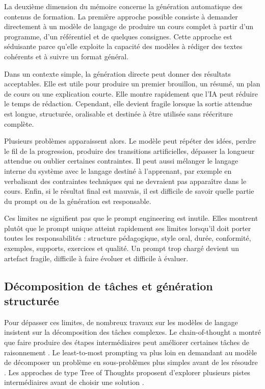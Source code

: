 \documentclass[12pt,a4paper]{article}
\begin{document}
La deuxième dimension du mémoire concerne la génération automatique des contenus de
formation. La première approche possible consiste à demander directement à un modèle
de langage de produire un cours complet à partir d'un programme, d'un référentiel et de
quelques consignes. Cette approche est séduisante parce qu'elle exploite la capacité des
modèles à rédiger des textes cohérents et à suivre un format général.

Dans un contexte simple, la génération directe peut donner des résultats acceptables. Elle
est utile pour produire un premier brouillon, un résumé, un plan de cours ou une
explication courte. Elle montre rapidement que l'IA peut réduire le temps de rédaction.
Cependant, elle devient fragile lorsque la sortie attendue est longue, structurée,
oralisable et destinée à être utilisée sans réécriture complète.

Plusieurs problèmes apparaissent alors. Le modèle peut répéter des idées, perdre le fil de
la progression, produire des transitions artificielles, dépasser la longueur attendue ou
oublier certaines contraintes. Il peut aussi mélanger le langage interne du système avec
le langage destiné à l'apprenant, par exemple en verbalisant des contraintes techniques
qui ne devraient pas apparaître dans le cours. Enfin, si le résultat final est mauvais, il est
difficile de savoir quelle partie du prompt ou de la génération est responsable.

Ces limites ne signifient pas que le prompt engineering est inutile. Elles montrent plutôt
que le prompt unique atteint rapidement ses limites lorsqu'il doit porter toutes les
responsabilités : structure pédagogique, style oral, durée, conformité, exemples,
supports, exercices et qualité. Un prompt trop chargé devient un artefact fragile, difficile
à faire évoluer et difficile à évaluer.

\subsection{Décomposition de tâches et génération structurée}

Pour dépasser ces limites, de nombreux travaux sur les modèles de langage insistent sur
la décomposition des tâches complexes. Le chain-of-thought a montré que faire produire
des étapes intermédiaires peut améliorer certaines tâches de raisonnement
\cite{wei2022chain}. Le least-to-most prompting va plus loin en demandant au modèle de
décomposer un problème en sous-problèmes plus simples avant de les résoudre
\cite{zhou2022least}. Les approches de type Tree of Thoughts proposent d'explorer
plusieurs pistes intermédiaires avant de choisir une solution \cite{yao2023tree}.
\end{document}
